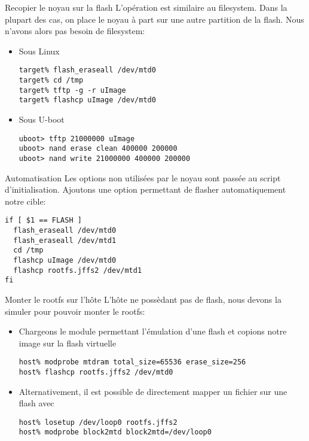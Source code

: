 \begin{frame}[fragile=singleslide]{Recopier le noyau sur la flash}
  L'opération est similaire au filesystem. Dans la plupart des cas, on
  place le  noyau à  part sur  une autre partition  de la  flash. Nous
  n'avons alors pas besoin de filesystem:
  \begin{itemize} 
  \item Sous Linux
    \begin{lstlisting}
target% flash_eraseall /dev/mtd0
target% cd /tmp
target% tftp -g -r uImage
target% flashcp uImage /dev/mtd0
    \end{lstlisting}
  \item Sous U-boot
    \begin{lstlisting} 
uboot> tftp 21000000 uImage
uboot> nand erase clean 400000 200000
uboot> nand write 21000000 400000 200000
    \end{lstlisting} 
  \end{itemize}
\end{frame}

\begin{frame}[fragile=singleslide]{Automatisation}
  Les  options  non utilisées  par  le  noyau  sont passée  au  script
  d'initialisation.   Ajoutons  une   option  permettant   de  flasher
  automatiquement notre cible:
  \begin{lstlisting}
if [ $1 == FLASH ]
  flash_eraseall /dev/mtd0
  flash_eraseall /dev/mtd1
  cd /tmp
  flashcp uImage /dev/mtd0
  flashcp rootfs.jffs2 /dev/mtd1
fi
  \end{lstlisting}
\end{frame}

\begin{frame}[fragile=singleslide]{Monter le rootfs sur l'hôte}
  L'hôte  ne possèdant  pas  de  flash, nous  devons  la simuler  pour
  pouvoir monter le rootfs:
  \begin{itemize} 
  \item  Chargeons le  module  permettant l'émulation  d'une flash  et
    copions notre image sur la flash virtuelle
    \begin{lstlisting}
host% modprobe mtdram total_size=65536 erase_size=256
host% flashcp rootfs.jffs2 /dev/mtd0
    \end{lstlisting}
  \item  Alternativement, il  est  possible de  directement mapper  un
    fichier sur une flash avec 
    \begin{lstlisting}
host% losetup /dev/loop0 rootfs.jffs2
host% modprobe block2mtd block2mtd=/dev/loop0
    \end{lstlisting} 
  \end{itemize}
\end{frame}

